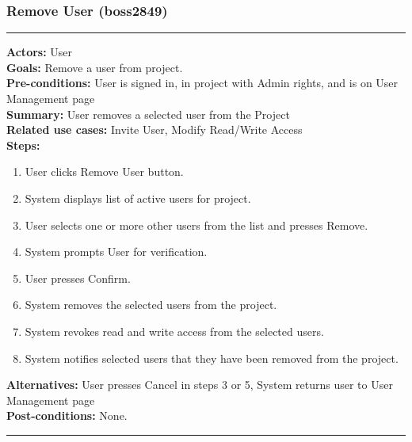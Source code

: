 \documentclass[11pt]{report}
\begin{document}
\subsubsection{Remove User  (boss2849)}
\vspace{2pt}
\hrule
\vspace{8pt}
 \textbf{Actors:} User \\ 
 \textbf{Goals:} Remove a user from project. \\
 \textbf{Pre-conditions:} User is signed in, in project with Admin rights, and is on User Management page\\
 \textbf{Summary:} User removes a selected user from the Project \\ 
 \textbf{Related use cases:} Invite User, Modify Read/Write Access \\ 
 \textbf{Steps:} \begin{enumerate}
  \item User clicks Remove User button.
  \item System displays list of active users for project.
  \item User selects one or more other users from the list and presses Remove.
  \item System prompts User for verification.
  \item User presses Confirm.
  \item System removes the selected users from the project.
  \item System revokes read and write access from the selected users.
  \item System notifies selected users that they have been removed from the project.
 \end{enumerate}
 \textbf{Alternatives:} User presses Cancel in steps 3 or 5, System returns user to User Management page \\
 \textbf{Post-conditions:} None. \\
 \vspace{8pt}
\hrule
\newpage
\end{document}
